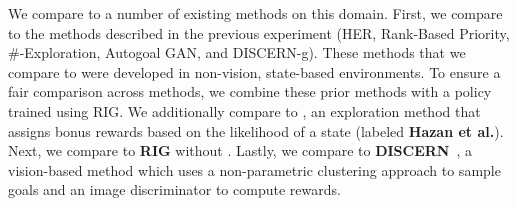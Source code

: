 We compare \METHOD to a number of existing methods on this domain.
First, we compare to the methods described in the previous experiment (HER, Rank-Based Priority, \#-Exploration, Autogoal GAN, and \mbox{DISCERN-g}).
These methods that we compare to were developed in non-vision, state-based environments.
To ensure a fair comparison across methods, we combine these prior methods with a policy trained using RIG.
We additionally compare to \citet{hazan2019provably}, an exploration method that assigns bonus rewards based on the likelihood of a state (labeled \textbf{Hazan et al.}).
Next, we compare to \textbf{RIG} without \METHOD.
Lastly, we compare to \textbf{DISCERN}~\citep{wardefarley2018discern}, a vision-based method which uses a non-parametric clustering approach to sample goals and an image discriminator to compute rewards.

